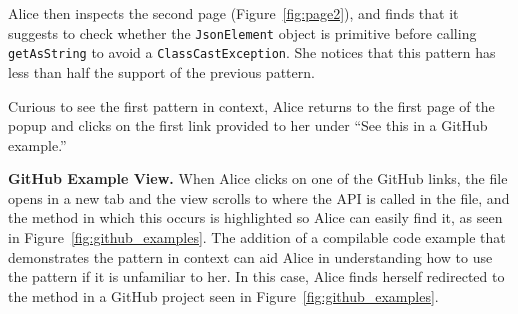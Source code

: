 Alice then inspects the second page (Figure~\ref{fig:page2}), and finds that it suggests to check whether the {\tt JsonElement} object is primitive before calling {\tt getAsString} to avoid a {\tt ClassCastException}. She notices that this pattern has less than half the support of the previous pattern.

Curious to see the first pattern in context, Alice returns to the first page of the popup and clicks on the first link provided to her under ``See this in a GitHub example.''



{\bf GitHub Example View.} When Alice clicks on one of the GitHub links, the file opens in a new tab and the view scrolls to where the API is called in the file, and the method in which this occurs is highlighted so Alice can easily find it, as seen in Figure~\ref{fig:github_examples}. The addition of a compilable code example that demonstrates the pattern in context can aid Alice in understanding how to use the pattern if it is unfamiliar to her. In this case, Alice finds herself redirected to the method in a GitHub project seen in Figure~\ref{fig:github_examples}.

